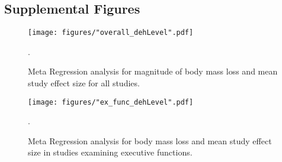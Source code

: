 \begin{appendices}
%		


\chapter{Supplemental Figures}

\begin{figure}
	\centering
	\texttt{[image: figures/"overall\_dehLevel".pdf]}
	\caption{Meta Regression analysis for magnitude of body mass loss and mean study effect size for all studies.}.
	\label{fig:overall_dehLevel}
\end{figure}

\begin{figure}
	\centering
	\texttt{[image: figures/"ex\_func\_dehLevel".pdf]}
	\caption{Meta Regression analysis for body mass loss and mean study effect size in studies examining executive functions.}.
	\label{fig:ex_func_bm_correlation}
\end{figure}


\end{appendices}
